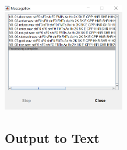 \documentclass[
]{article}
\begin{document}
\begin{enumerate}
  \includegraphics[width=0.4\textwidth,height=\textheight]{image/vs_processing_complete.png}
\end{enumerate}

\hypertarget{output-to-text}{%
\subsection{Output to Text}\label{output-to-text}}
\end{document}
